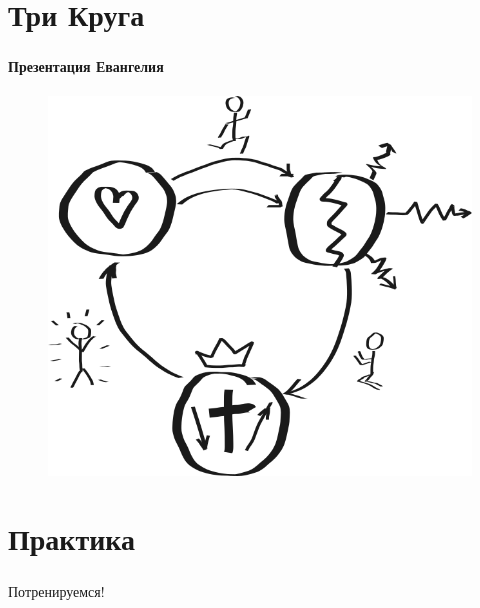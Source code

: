 \documentclass[t,aspectratio=169,14pt]{beamer}  %
\begin{document}
\section{Три Круга}
\begin{frame}[c]
	\frametitle{\insertsection}
	\framesubtitle{Презентация Евангелия}
	\begin{figure}[h]
		\includegraphics[height=0.76\textheight]{3circles.png}
	\end{figure}
\end{frame}
\section{Практика}
\begin{frame}[c]
\frametitle{\insertsection}
\begin{block}{}
	\centering \Huge Потренируемся!
\end{block}
\end{frame}
\end{document}
